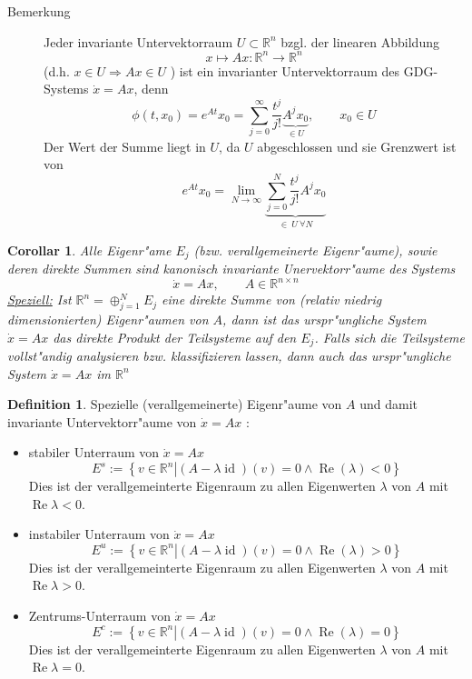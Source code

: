 \documentclass[a4paper, 13pt]{scrreprt}
\newtheorem{corollar}[theorem]{Corollar}
\theoremstyle{definition} \newtheorem{definition}{Definition}[section]
\newcommand{\RR}{\mathbb{R}}
\begin{document}
\begin{description}
\item [Bemerkung]
	Jeder invariante Untervektorraum \(U \subset \RR^n \) bzgl. der linearen Abbildung 
		\[x \mapsto Ax : \RR^n \rightarrow \RR^n \]
(d.h. $x\in U\Rightarrow Ax \in U$ ) ist ein invarianter Untervektorraum des GDG-Systems \(\dot{x} = Ax\), denn
		\[\phi(t,x_0) = e^{At} x_0 = \sum_{j=0}^{\infty} \frac{t^j}{j!} \underbrace{A^j x_0}_{\in U}, \qquad x_0 \in U\]
Der Wert der Summe liegt in \(U\), da $U$ abgeschlossen und sie Grenzwert ist von
	\[ e^{At} x_0 = \lim_{N\to \infty} \underbrace{\sum_{j=0}^{N} \frac{t^j}{j!} A^j x_0 }_{\in\  U\ \forall N} \]
\end{description}

\begin{corollar}
	Alle Eigenr"ame \(E_j\) (bzw. verallgemeinerte Eigenr"aume), sowie deren direkte Summen sind kanonisch invariante Unervektorr"aume des Systems
		\[\dot{x} = Ax, \qquad A \in \RR^{n\times n} \]
	\underline{Speziell:} Ist \(\RR^n = \oplus_{j=1}^{N} E_j \) eine direkte Summe von (relativ niedrig dimensionierten) Eigenr"aumen von \(A\), dann ist das urspr"ungliche System \(\dot{x}=Ax\) das direkte Produkt der Teilsysteme auf den \(E_j\).
	Falls sich die Teilsysteme vollst"andig analysieren bzw. klassifizieren lassen, dann auch das urspr"ungliche System \(\dot{x} = Ax\) im \(\RR^n\)
\end{corollar}

\begin{definition}
	Spezielle (verallgemeinerte) Eigenr"aume von \(A\) und damit invariante Untervektorr"aume von \(\dot{x}=Ax\) : 
	\begin{itemize} 
		\item stabiler Unterraum von \(\dot{x}=Ax\)
			$$E^s := \left\{\left. v\in \RR^n \right| (A-\lambda \operatorname{id})(v) = 0 \land \operatorname{Re}(\lambda) < 0\right\}$$ 
			Dies ist der verallgemeinterte Eigenraum zu allen Eigenwerten $\lambda$ von $A$ mit $\operatorname{Re}\lambda < 0$.
		\item instabiler Unterraum von \(\dot{x}=Ax\)
		$$E^u := \left\{\left. v\in \RR^n \right| (A-\lambda \operatorname{id})(v) = 0 \land \operatorname{Re}(\lambda) > 0\right\}$$ 
			Dies ist der verallgemeinterte Eigenraum zu allen Eigenwerten $\lambda$ von $A$ mit $\operatorname{Re}\lambda > 0$.
		\item Zentrums-Unterraum von \(\dot{x}=Ax\)
		$$E^c := \left\{\left. v\in \RR^n \right| (A-\lambda \operatorname{id})(v) = 0 \land \operatorname{Re}(\lambda) = 0\right\}$$ 
			Dies ist der verallgemeinterte Eigenraum zu allen Eigenwerten $\lambda$ von $A$ mit $\operatorname{Re}\lambda = 0$.
	\end{itemize}
\end{definition}
\end{document}
